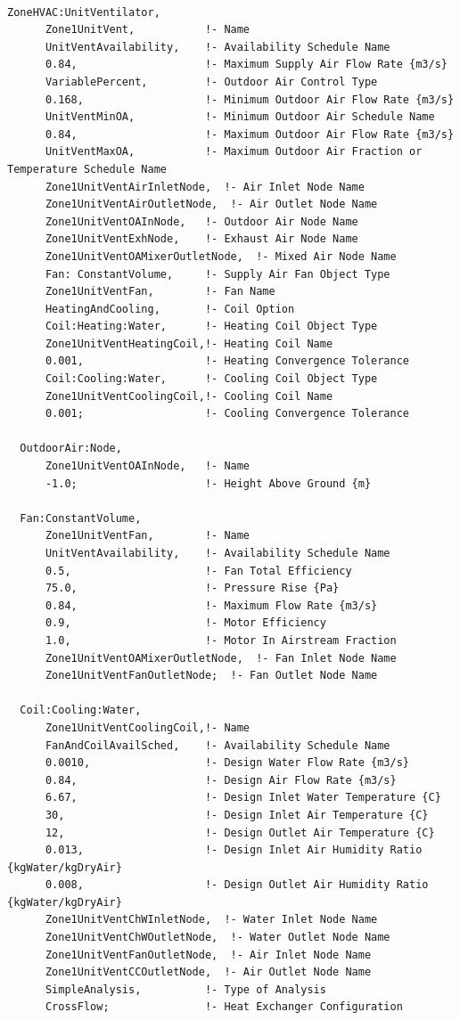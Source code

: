\begin{lstlisting}

ZoneHVAC:UnitVentilator,
      Zone1UnitVent,           !- Name
      UnitVentAvailability,    !- Availability Schedule Name
      0.84,                    !- Maximum Supply Air Flow Rate {m3/s}
      VariablePercent,         !- Outdoor Air Control Type
      0.168,                   !- Minimum Outdoor Air Flow Rate {m3/s}
      UnitVentMinOA,           !- Minimum Outdoor Air Schedule Name
      0.84,                    !- Maximum Outdoor Air Flow Rate {m3/s}
      UnitVentMaxOA,           !- Maximum Outdoor Air Fraction or Temperature Schedule Name
      Zone1UnitVentAirInletNode,  !- Air Inlet Node Name
      Zone1UnitVentAirOutletNode,  !- Air Outlet Node Name
      Zone1UnitVentOAInNode,   !- Outdoor Air Node Name
      Zone1UnitVentExhNode,    !- Exhaust Air Node Name
      Zone1UnitVentOAMixerOutletNode,  !- Mixed Air Node Name
      Fan: ConstantVolume,     !- Supply Air Fan Object Type
      Zone1UnitVentFan,        !- Fan Name
      HeatingAndCooling,       !- Coil Option
      Coil:Heating:Water,      !- Heating Coil Object Type
      Zone1UnitVentHeatingCoil,!- Heating Coil Name
      0.001,                   !- Heating Convergence Tolerance
      Coil:Cooling:Water,      !- Cooling Coil Object Type
      Zone1UnitVentCoolingCoil,!- Cooling Coil Name
      0.001;                   !- Cooling Convergence Tolerance

  OutdoorAir:Node,
      Zone1UnitVentOAInNode,   !- Name
      -1.0;                    !- Height Above Ground {m}

  Fan:ConstantVolume,
      Zone1UnitVentFan,        !- Name
      UnitVentAvailability,    !- Availability Schedule Name
      0.5,                     !- Fan Total Efficiency
      75.0,                    !- Pressure Rise {Pa}
      0.84,                    !- Maximum Flow Rate {m3/s}
      0.9,                     !- Motor Efficiency
      1.0,                     !- Motor In Airstream Fraction
      Zone1UnitVentOAMixerOutletNode,  !- Fan Inlet Node Name
      Zone1UnitVentFanOutletNode;  !- Fan Outlet Node Name

  Coil:Cooling:Water,
      Zone1UnitVentCoolingCoil,!- Name
      FanAndCoilAvailSched,    !- Availability Schedule Name
      0.0010,                  !- Design Water Flow Rate {m3/s}
      0.84,                    !- Design Air Flow Rate {m3/s}
      6.67,                    !- Design Inlet Water Temperature {C}
      30,                      !- Design Inlet Air Temperature {C}
      12,                      !- Design Outlet Air Temperature {C}
      0.013,                   !- Design Inlet Air Humidity Ratio {kgWater/kgDryAir}
      0.008,                   !- Design Outlet Air Humidity Ratio {kgWater/kgDryAir}
      Zone1UnitVentChWInletNode,  !- Water Inlet Node Name
      Zone1UnitVentChWOutletNode,  !- Water Outlet Node Name
      Zone1UnitVentFanOutletNode,  !- Air Inlet Node Name
      Zone1UnitVentCCOutletNode,  !- Air Outlet Node Name
      SimpleAnalysis,          !- Type of Analysis
      CrossFlow;               !- Heat Exchanger Configuration


\end{lstlisting}
